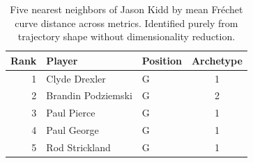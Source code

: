 \begin{table}[htbp]
  \centering\small
  \begin{tabular}{rllc}
    \toprule
    Rank & Player & Position & Archetype \\
    \midrule
    1 & Clyde Drexler & G & 1 \\
    2 & Brandin Podziemski & G & 2 \\
    3 & Paul Pierce & G & 1 \\
    4 & Paul George & G & 1 \\
    5 & Rod Strickland & G & 1 \\
    \bottomrule
  \end{tabular}
  \caption{Five nearest neighbors of Jason Kidd by mean Fr\'{e}chet curve distance across metrics. Identified purely from trajectory shape without dimensionality reduction.}
  \label{tab:Jason_Kidd_frechet_curve_neighbors}
\end{table}

